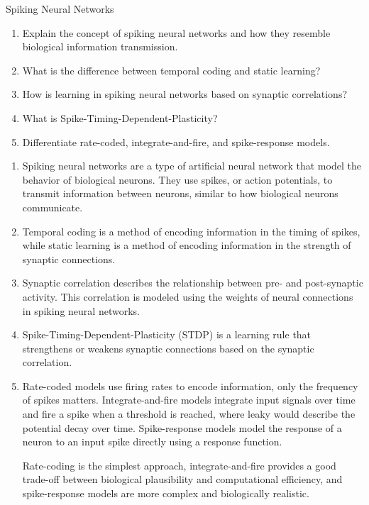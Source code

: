 \documentclass{article}
\author{Leopold Lemmermann}
\begin{document}
\createtitle


\begin{exercise}{Spiking Neural Networks}
  \begin{enumerate}
    \item Explain the concept of spiking neural networks and how they resemble biological information transmission.
    \item What is the difference between temporal coding and static learning?
    \item How is learning in spiking neural networks based on synaptic correlations?
    \item What is Spike-Timing-Dependent-Plasticity?
    \item Differentiate rate-coded, integrate-and-fire, and spike-response models.
  \end{enumerate}

  \begin{solution}
    \begin{enumerate}
      \item Spiking neural networks are a type of artificial neural network that model the behavior of biological neurons. They use spikes, or action potentials, to transmit information between neurons, similar to how biological neurons communicate.
      \item Temporal coding is a method of encoding information in the timing of spikes, while static learning is a method of encoding information in the strength of synaptic connections.
      \item Synaptic correlation describes the relationship between pre- and post-synaptic activity. This correlation is modeled using the weights of neural connections in spiking neural networks.
      \item Spike-Timing-Dependent-Plasticity (STDP) is a learning rule that strengthens or weakens synaptic connections based on the synaptic correlation.
      \item Rate-coded models use firing rates to encode information, only the frequency of spikes matters. Integrate-and-fire models integrate input signals over time and fire a spike when a threshold is reached, where leaky would describe the potential decay over time. Spike-response models model the response of a neuron to an input spike directly using a response function.
            \par Rate-coding is the simplest approach, integrate-and-fire provides a good trade-off between biological plausibility and computational efficiency, and spike-response models are more complex and biologically realistic.
    \end{enumerate}
  \end{solution}
\end{exercise}
\end{document}

